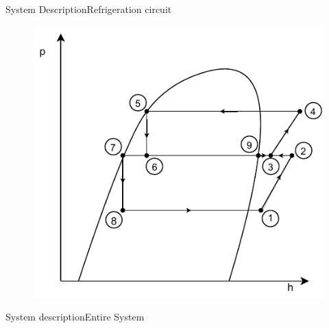 \begin{frame}{System Description}{Refrigeration circuit}
\begin{figure}[h]
\begin{minipage}{0.4\textwidth}
		\includegraphics[width=1.05\textwidth]{../Graphics/Flash_Tank_P-h_Diagram} %
	\end{minipage}
\end{figure}
\end{frame}

\begin{frame}{System description}{Entire System}
	
\end{frame}

%

